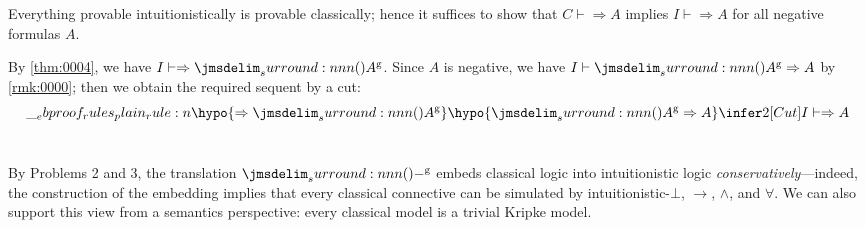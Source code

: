 \documentclass[a4paper]{article}
\newcommand{\gtrans}[1]{\prn{#1}^{\mathrm{g}}}
\begin{document}
Everything provable intuitionistically is provable classically; hence it suffices to show that $C \vdash \Rightarrow A$ implies $I \vdash \Rightarrow A$ for all negative formulas $A$.

By \cref{thm:0004}, we have $I \vdash \Rightarrow \gtrans{A}$.
Since $A$ is negative, we have $I \vdash \gtrans{A} \Rightarrow A$ by \cref{rmk:0000}; then we obtain the required sequent by a cut:
\[
  \ebrule{
    \hypo{\Rightarrow \gtrans{A}}
    \hypo{\gtrans{A} \Rightarrow A}
    \infer2[Cut]{I \vdash \Rightarrow A}
  }
\]

\section{}

By Problems 2 and 3, the translation $\gtrans{-}$ embeds classical logic into intuitionistic logic \emph{conservatively}---indeed, the construction of the embedding implies that every classical connective can be simulated by intuitionistic-$\bot$, $\to$, $\wedge$, and $\forall$.
We can also support this view from a semantics perspective: every classical model is a trivial Kripke model.

% 
% 
\end{document}
